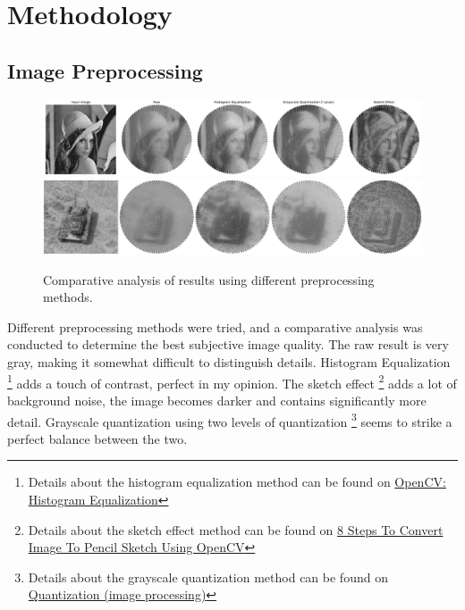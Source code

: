 \chapter{Methodology}

\section{Image Preprocessing}

\begin{figure}[H]
    \centering
    \includegraphics[width=\linewidth]{images/preprocess/preprocessed_results.pdf}
    \includegraphics[width=\linewidth]{images/preprocess/preprocessed_results_tank.pdf}
    \caption{Comparative analysis of results using different preprocessing methods.}
    \label{fig:preprocess_results}
\end{figure}

Different preprocessing methods were tried, and a comparative analysis was conducted to determine the best subjective image quality. The raw result is very gray, making it somewhat difficult to distinguish details. Histogram Equalization \footnote{Details about the histogram equalization method can be found on \href{https://docs.opencv.org/4.x/d4/d1b/tutorial_histogram_equalization.html}{OpenCV: Histogram Equalization}} adds a touch of contrast, perfect in my opinion. The sketch effect \footnote{Details about the sketch effect method can be found on \href{https://medium.com/@Kavya2099/image-to-pencil-sketch-using-opencv-ec3568443c5e}{8 Steps To Convert Image To Pencil Sketch Using OpenCV}} adds a lot of background noise, the image becomes darker and contains significantly more detail. Grayscale quantization using two levels of quantization \footnote{Details about the grayscale quantization method can be found on \href{https://en.wikipedia.org/wiki/Quantization_(image_processing)\#Grayscale_quantization}{Quantization (image processing)}} seems to strike a perfect balance between the two.

